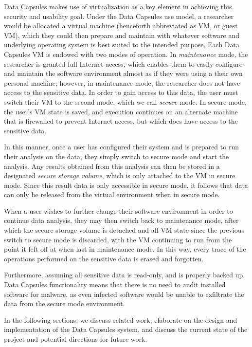 \documentclass{acm_proc_article-sp}
\begin{document}
Data Capsules makes use of virtualization as a key element in achieving this
security and usability goal.  Under the Data Capsules use model, a researcher
would be allocated a virtual machine (henceforth abbreviated as VM, or guest
VM), which they could then prepare and maintain with whatever software and
underlying operating system is best suited to the intended purpose.  Each Data
Capsules VM is endowed with two modes of operation.  In \emph{maintenance}
mode, the researcher is granted full Internet access, which enables them to
easily configure and maintain the software environment almost as if they were
using a their own personal machine; however, in maintenance mode, the
researcher does not have access to the sensitive data.  In order to gain access
to this data, the user must switch their VM to the second mode, which we call
\emph{secure} mode.  In secure mode, the user's VM state is saved, and
execution continues on an alternate machine that is firewalled to prevent
Internet access, but which does have access to the sensitive data.

In this manner, once a user has configured their system and is prepared to
run their analysis on the data, they simply switch to secure mode and start
the analysis.  Any results obtained from this analysis can then be stored in a
designated \emph{secure storage volume}, which is only attached to the VM in
secure mode.  Since this result data is only accessible in secure mode, it
follows that data can only be released from the virtual environment when in
secure mode.

When a user wishes to further change their software environment in order to
continue data analysis, they may then switch back to maintenance mode, after
which the secure storage volume is detached and all VM state since the
previous switch to secure mode is discarded, with the VM continuing to run from
the point it left off at when last in maintenance mode.  In this way, every
trace of the operations performed on the sensitive data is erased and forgotten.

Furthermore, assuming all sensitive data is read-only, and is properly backed
up, Data Capsules functionality means that there is no need to audit installed
software for malware, as even infected software would be unable to exfiltrate
the data from the secure mode environment.

In the following sections, we discuss related work, elaborate on the design and
implementation of the Data Capsules system, and discuss the current state of
the project and potential directions for future work.
\end{document}
